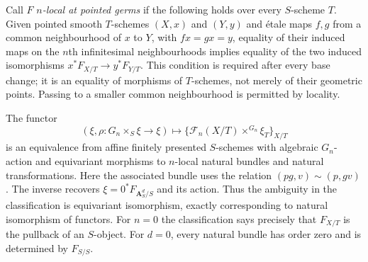 Call $F$ \emph{$n$-local at pointed germs} if the following holds over every
$S$-scheme $T$. Given pointed smooth $T$-schemes $(X,x)$ and $(Y,y)$ and
\'{e}tale maps $f,g$ from a common neighbourhood of $x$ to $Y$, with
$f x=g x=y$, equality of their induced maps on the $n$th infinitesimal
neighbourhoods implies equality of the two induced isomorphisms
$x^*F_{X/T}\to y^*F_{Y/T}$. This condition is required after every base
change; it is an equality of morphisms of $T$-schemes, not merely of their
geometric points. Passing to a smaller common neighbourhood is permitted
by locality.

\begin{theorem}
\label{geo-F-fixed}
The functor
\[
 (\xi,\rho:G_n\times_S\xi\to\xi)
 \longmapsto
 \bigl\{\mathcal F_n(X/T)\mathbin{\times^{G_n}}\xi_T\bigr\}_{X/T}
\]
is an equivalence from affine finitely presented $S$-schemes with algebraic
$G_n$-action and equivariant morphisms to $n$-local natural bundles and
natural transformations. Here the associated bundle uses the relation
$(p g,v)\sim(p,g v)$. The inverse recovers
$\xi=0^*F_{\mathbf A^d_S/S}$ and its action. Thus the ambiguity in the
classification is equivariant isomorphism, exactly corresponding to natural
isomorphism of functors. For $n=0$ the classification says precisely that
$F_{X/T}$ is the pullback of an $S$-object. For $d=0$, every natural bundle
has order zero and is determined by $F_{S/S}$.
\end{theorem}
